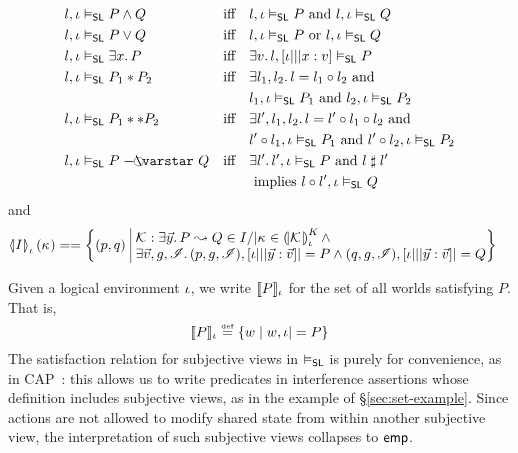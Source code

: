 \begin{definition}
\begin{align*}
%
% 
  l, \lenv & \slsat P \land Q
  &&\text{iff}&& l, \lenv \slsat P\text{ and } l, \lenv \slsat Q\\
%
  l, \lenv & \slsat P \lor Q
  &&\text{iff}&& l, \lenv \slsat P\text{ or } l, \lenv \slsat Q\\
%
  l, \lenv & \slsat \exsts x P
  &&\text{iff}&& \exsts{v} l, [\lenv|||x:v] \slsat P\\
%  
  l, \lenv &\slsat P_1 * P_2 &&\text{iff}&&
  \exsts{l_1, l_2} l = l_1 \composeL l_2 \text{ and}\\
  &&&&& l_1, \lenv \slsat P_1 \text{ and } l_2, \lenv \slsat P_2\\
%  
%  
  l, \lenv &\slsat P_1 ** P_2 &&\text{iff}&&
  \exsts{l', l_1, l_2} l = l' \composeL l_1 \composeL l_2\text{ and}\\
  &&&&&
  l' \composeL l_1, \lenv \slsat P_1 \text{ and }
  l' \composeL l_2, \lenv \slsat P_2\\
%  
%  
  l, \lenv & \slsat P \septraction Q &&\text{iff}&&
  \exsts{l'} l', \lenv \slsat P \text{ and }
  l \compatible l'\\
  &&&&&\text{ implies } l \composeL l', \lenv \slsat Q
\end{align*}
%
and
\begin{align*}
  \semI[\lenv]{I}(\ca{}) &==
  \left\{
  \begin{array}{@{}l@{\ }|@{\ }r@{}}
    (p,q)&
    \begin{array}{@{}l@{}}
      \interAss{\capAss{}}{\vec{y}}{P}{Q} \in I /| \ca{} \in \semK[\lenv]{\capAss{}}\land\\
      \exsts{\vec{v}, g, \lmod}
      (p, g, \lmod), [\lenv|||\vec y:\vec v] |= P \land
      (q, g, \lmod), [\lenv|||\vec y:\vec v] |= Q
    \end{array}
  \end{array}
  \right\}
  \end{align*}
\end{definition}
%
\noindent Given a logical environment $\lenv$, we write $\sem[\lenv]{P}$ for the set of all worlds satisfying $P$. That is, 
%
\[
	\sem[\lenv]{P} \eqdef \left\{ w \mid w, \lenv |= P \right\}
\]	
%
The satisfaction relation for subjective views in $\slsat$ is purely for convenience, as in CAP~\cite{cap-ecoop10}: this allows us to write predicates in interference assertions whose definition includes subjective views, as in the example of \S\ref{sec:set-example}. Since actions are not allowed to modify shared state from within another subjective view, the interpretation of such subjective views collapses to $\emp$.

